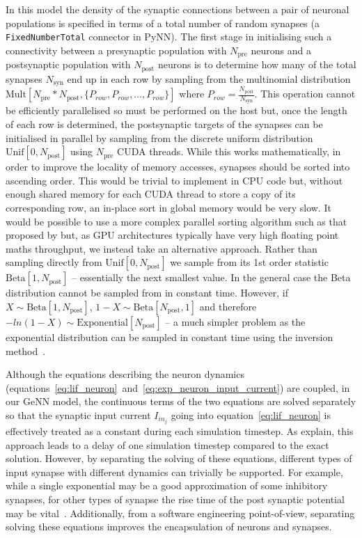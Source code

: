 \documentclass[utf8]{frontiersSCNS} %
\begin{document}
In this model the density of the synaptic connections between a pair of neuronal populations is specified in terms of a total number of random synapses (a \lstinline{FixedNumberTotal} connector in PyNN).
The first stage in initialising such a connectivity between a presynaptic population with $N_{\text{pre}}$ neurons and a postsynaptic population with $N_{\text{post}}$ neurons is to determine how many of the total synapses $N_{\text{syn}}$ end up in each row by sampling from the multinomial distribution $\text{Mult}[N_{\text{pre}} * N_{\text{post}}, \{P_{row}, P_{row}, \ldots, P_{row}\}]$ where $P_{row} = \frac{N_{\text{post}}}{N_{\text{syn}}}$.
This operation cannot be efficiently parallelised so must be performed on the host but, once the length of each row is determined, the postsynaptic targets of the synapses can be initialised in parallel by sampling from the discrete uniform distribution $\text{Unif}[0, N_{\text{post}}]$ using $N_{\text{pre}}$ CUDA threads.
While this works mathematically, in order to improve the locality of memory accesses, synapses should be sorted into ascending order.
This would be trivial to implement in CPU code but, without enough shared memory for each CUDA thread to store a copy of its corresponding row, an in-place sort in global memory would be very slow.
It would be possible to use a more complex parallel sorting algorithm such as that proposed by \citet{Awan2016} but, as GPU architectures typically have very high floating point maths throughput, we instead take an alternative approach.
Rather than sampling directly from $\text{Unif}[0, N_{\text{post}}]$ we sample from its 1st order statistic $\text{Beta}[1, N_{\text{post}}]$ -- essentially the next smallest value.
In the general case the Beta distribution cannot be sampled from in constant time.
However, if $X \sim \text{Beta}[1, N_{\text{post}}]$, $1 - X \sim \text{Beta}[N_{\text{post}}, 1]$ and therefore $-ln(1 - X) \sim \text{Exponential}[N_{\text{post}}]$ -- a much simpler problem as the exponential distribution can be sampled in constant time using the inversion method~\citep[p29]{DevroyeLuc2013}.

Although the equations describing the neuron dynamics (equations~\ref{eq:lif_neuron}~and~\ref{eq:exp_neuron_input_current}) are coupled, in our GeNN model, the continuous terms of the two equations are solved separately so that the synaptic input current $I_{{in}_{j}}$ going into equation~\ref{eq:lif_neuron} is effectively treated as a constant during each simulation timestep.
As \citet{Rotter1999} explain, this approach leads to a delay of one simulation timestep compared to the exact solution.
However, by separating the solving of these equations, different types of input synapse with different dynamics can trivially be supported.
For example, while a single exponential may be a good approximation of some inhibitory synapses, for other types of synapse the rise time of the post synaptic potential may be vital~\citep{VanVreeswijk1994}.                                                                                                      
Additionally, from a software engineering point-of-view, separating solving these equations improves the encapsulation of neurons and synapses.
\end{document}
